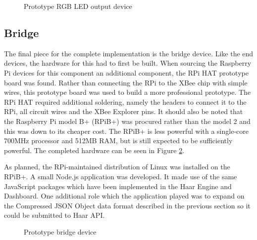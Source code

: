       \begin{figure}
        \centering
        \caption{Prototype RGB LED output device}\label{figure:led-device}
      \end{figure}

    \subsection{Bridge}
      The final piece for the complete implementation is the bridge device. Like the end devices, the hardware for this had to first be built. When sourcing the Raspberry Pi devices for this component an additional component, the RPi HAT prototype board was found. Rather than connecting the RPi to the XBee chip with simple wires, this prototype board was used to build a more professional prototype. The RPi HAT required additional soldering, namely the headers to connect it to the RPi, all circuit wires and the XBee Explorer pins. It should also be noted that the Raspberry Pi model B+ (RPiB+)  was procured rather than the model 2 and this was down to its cheaper cost. The RPiB+ is less powerful with a single-core 700MHz processor and 512MB RAM, but is still expected to be sufficiently powerful. The completed hardware can be seen in Figure \ref{figure:bridge-device}.

      As planned, the RPi-maintained distribution of Linux was installed on the RPiB+. A small Node.js application was developed. It made use of the same JavaScript packages which have been implemented in the Haar Engine and Dashboard. One additional role which the application played was to expand on the Compressed JSON Object data format described in the previous section so it could be submitted to Haar API.

      \begin{figure}
        \centering
        \caption{Prototype bridge device}\label{figure:bridge-device}
      \end{figure}
